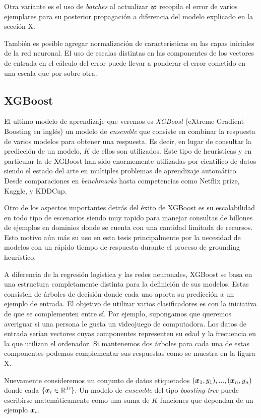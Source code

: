 Otra variante es el uso de \emph{batches} al actualizar $\boldsymbol{w}$ recopila el
error de varios ejemplares para su posterior propagación a diferencia del modelo
explicado en la sección X.

También es posible agregar normalización de caracteristicas en las capas
iniciales de la red neuronal. El uso de escalas distintas en las componentes de
los vectores de entrada en el cálculo del error puede llevar a ponderar el error
cometido en una escala que por sobre otra.

\subsection{XGBoost}

El ultimo modelo de aprendizaje que veremos es \emph{XGBoost} (eXtreme Gradient
Boosting en inglés) un modelo de \emph{ensemble} que consiste en combinar la
respuesta de varios modelos para obtener una respuesta. Es decir, en lugar de
consultar la predicción de un modelo, $K$ de ellos son utilizados. Este tipo de
heurísticas y en particular la de XGBoost han sido enormemente utilizadas por
cientifico de datos siendo el estado del arte en multiples problemas de
aprendizaje automático. Desde comparaciones en \emph{benchmarks} hasta
competencias como Netflix prize, Kaggle, y KDDCup.

Otro de los aspectos importantes detrás del éxito de XGBoost es su escalabilidad
en todo tipo de escenarios siendo muy rapido para manejar consultas de billones
de ejemplos en dominios donde se cuenta con una cantidad limitada de recursos.
Esto motivo aún más su uso en esta tesis principalmente por la necesidad de
modelos con un rápido tiempo de respuesta durante el proceso de grounding
heurístico.

A diferencia de la regresión logistica y las redes neuronales, XGBoost se basa
en una estructura completamente distinta para la definición de sus modelos.
Estas consisten de árboles de decisión donde cada uno aporta su predicción a un
ejemplo de entrada. El objetivo de utilizar varios clasificadores es con la
iniciativa de que se complementen entre sí. Por ejemplo, supongamos que queremos
averiguar si una persona le gusta un videojuego de computadora. Los datos de
entrada serían vectores cuyas componentes representen su edad y la frecuencia en
la que utilizan el ordenador. Si mantenemos dos árboles para cada una de estas
componentes podemos complementar sus respuestas como se muestra en la figura X.

Nuevamente consideremos un conjunto de datos etiquetados ${(\boldsymbol{x}_1, y_1),
..., (\boldsymbol{x}_n, y_n)}$ donde cada $\{\boldsymbol{x}_i \in \mathbb{R}^{D}\}$. Un
modelo de \emph{ensemble} del tipo \emph{boosting tree} puede escribirse
matemáticamente como una suma de $K$ funciones que dependan de un ejemplo
$\boldsymbol{x}_i$.

